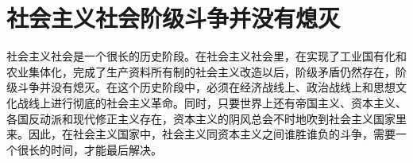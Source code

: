\section[社会主义社会阶级斗争并没有熄灭（一九六四年）]{社会主义社会阶级斗争并没有熄灭}


社会主义社会是一个很长的历史阶段。在社会主义社会里，在实现了工业国有化和农业集体化，完成了生产资料所有制的社会主义改造以后，阶级矛盾仍然存在，阶级斗争并没有熄灭。在这个历史阶段中，必须在经济战线上、政治战线上和思想文化战线上进行彻底的社会主义革命。同时，只要世界上还有帝国主义、资本主义、各国反动派和现代修正主义存在，资本主义的阴风总会不时地吹到社会主义国家里来。因此，在社会主义国家中，社会主义同资本主义之间谁胜谁负的斗争，需要一个很长的时间，才能最后解决。



